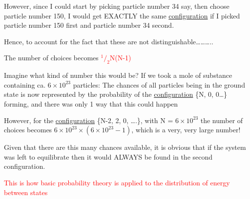 \documentclass[a4paper,12pt,titlepage]{article}
\begin{document}
\begin{frame}[allowframebreaks=0.7]
However, since I could start by picking particle number 34 say, then choose particle number 150, I would get EXACTLY the same \underline{configuration} if I picked particle number 150 first and particle number 34 second.\par\smallskip
 
Hence, to account for the fact that these are not distinguishable………..\par\smallskip
 
The number of choices becomes \textcolor{red}{\(^1/_2\)N(N-1)}\par\smallskip
 
Imagine what kind of number this would be?\newline\smallskip
If we took a mole of substance containing ca. \(6\times10^{23}\) particles:\newline
The chances of all particles being in the ground state is now represented by the probability of the \underline{configuration}
\{N, 0, 0…\} forming, and there was only 1 way that this could happen\par\smallskip
 
However, for the \underline{configuration} \{N-2, 2, 0, ….\}, with N = \(6\times10^{23}\) the number of choices becomes \(6\times10^{23}\times(6\times10^{23}- 1)\), which is a very, very large number!\par\smallskip
 
Given that there are this many chances available, it is obvious that if the system was left to equilibrate then it would ALWAYS be found in the second configuration.\par
 
\textcolor{red}{This is how basic probability theory is applied to the distribution of energy  between states}
\end{frame}
\end{document}
